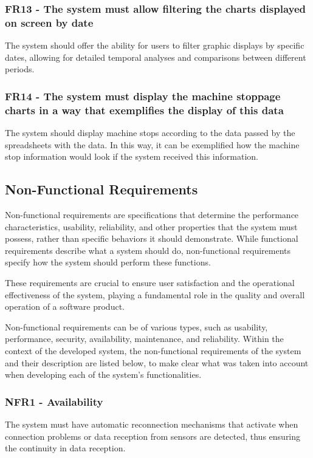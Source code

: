 \subsubsection{FR13 - The system must allow filtering the charts displayed on screen by date}
The system should offer the ability for users to filter graphic displays by specific dates, allowing for detailed temporal analyses and comparisons between different periods.

\subsubsection{FR14 - The system must display the machine stoppage charts in a way that exemplifies the display of this data}The system should display machine stops according to the data passed by the spreadsheets with the data. In this way, it can be exemplified how the machine stop information would look if the system received this information.

\subsection[Non-Functional Requirements]{Non-Functional Requirements}\label{ssubec:reqNfuctional}
Non-functional requirements are specifications that determine the performance characteristics, usability, reliability, and other properties that the system must possess, rather than specific behaviors it should demonstrate. While functional requirements describe what a system should do, non-functional requirements specify how the system should perform these functions.

These requirements are crucial to ensure user satisfaction and the operational effectiveness of the system, playing a fundamental role in the quality and overall operation of a software product.

Non-functional requirements can be of various types, such as usability, performance, security, availability, maintenance, and reliability. Within the context of the developed system, the non-functional requirements of the system and their description are listed below, to make clear what was taken into account when developing each of the system's functionalities.

\subsubsection{NFR1 - Availability}The system must have automatic reconnection mechanisms that activate when connection problems or data reception from sensors are detected, thus ensuring the continuity in data reception.

